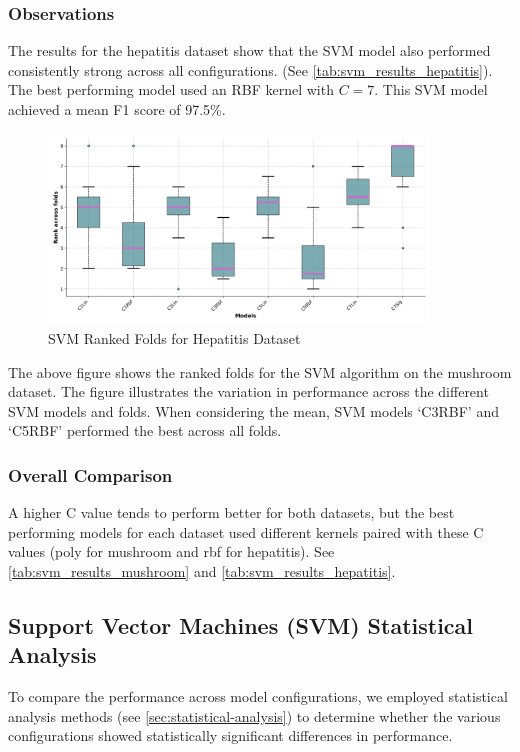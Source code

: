 \subsubsection*{Observations}
The results for the hepatitis dataset show that the SVM model also performed consistently strong across all configurations.
(See \autoref{tab:svm_results_hepatitis}).
The best performing model used an RBF kernel with $C=7$.
This SVM model achieved a mean F1 score of 97.5\%.

\begin{figure}
    \centering
    \includegraphics[width=0.9\textwidth]{figures/ranked_folds_SVM_hepatitis.png}
    \caption{SVM Ranked Folds for Hepatitis Dataset}
    \label{fig:ranked_folds_SVM_hepatitis}
\end{figure}

The above figure shows the ranked folds for the SVM algorithm on the mushroom dataset.
The figure illustrates the variation in performance across the different SVM models and folds.
When considering the mean, SVM models `C3RBF' and `C5RBF' performed the best across all folds.

\subsubsection*{Overall Comparison}
A higher C value tends to perform better for both datasets, 
but the best performing models for each dataset used different kernels paired with these C values
(poly for mushroom and rbf for hepatitis). See \autoref{tab:svm_results_mushroom} and \autoref{tab:svm_results_hepatitis}.

\subsection*{Support Vector Machines (SVM) Statistical Analysis}
To compare the performance across model configurations, we employed statistical analysis methods
(see \autoref{sec:statistical-analysis}) to determine whether the various configurations showed
statistically significant differences in performance.

